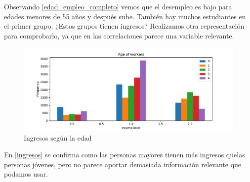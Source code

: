 \documentclass[twoside,openright,titlepage,numbers=noenddot,openany,headinclude,footinclude=true,
cleardoublepage=empty,abstractoff,BCOR=5mm,paper=a4,fontsize=12pt,main=spanish]{scrreprt}
\begin{document}
Observando \eqref{edad_empleo_completo} vemos que el desempleo es bajo para edades menores de 55 años y después sube. También hay muchos estudiantes en el primer grupo. ¿Estos grupos tienen ingresos? Realizamos otra representación para comprobarlo, ya que en las correlaciones parece una variable relevante.

\begin{figure}[H]
\includegraphics[scale=0.5]{edad_segun_income.pdf}
\caption{Ingresos según la edad}
\label{ingresos}
\end{figure}

En \eqref{ingresos} se confirma como las personas mayores tienen más ingresos quelas personas jóvenes, pero no parece aportar demasiada información relevante que podamos usar.








%
\newpage



{}


\end{document}
